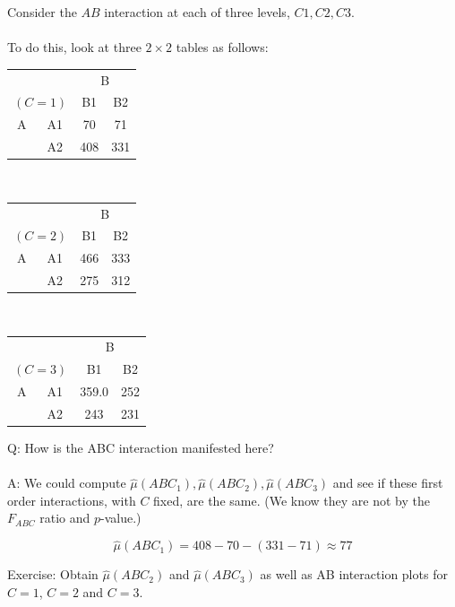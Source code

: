 Consider the $AB$ interaction at each of three levels, $C1,C2,C3$. \\~\\
To do this, look at three $2 \times 2$ tables as follows: 
\begin{center}
\begin{tabular}{cc|cc|}
&& \multicolumn{2}{c}{B} \\
\multicolumn{2}{c|}{$(C=1)$} & B1 & B2 \\ \hline
A & A1 & 70 & 71 \\
  & A2 & 408 & 331 \\ \hline
\end{tabular} \\

\begin{tabular}{cc|cc|}
&& \multicolumn{2}{c}{B} \\
\multicolumn{2}{c|}{$(C=2)$} & B1 & B2 \\ \hline
A & A1 & 466 & 333 \\
  & A2 & 275 & 312 \\ \hline
\end{tabular} \\

\begin{tabular}{cc|cc|}
&& \multicolumn{2}{c}{B} \\
\multicolumn{2}{c|}{$(C=3)$} & B1 & B2 \\ \hline
A & A1 & 359.0 & 252 \\
  & A2 & 243 & 231 \\ \hline
\end{tabular}
\end{center}

Q: How is the ABC interaction manifested here?\\~\\
A: We could compute $\hat\mu(ABC_1),\hat\mu(ABC_2),\hat\mu(ABC_3)$ and see if these first order interactions, with $C$ fixed, are the same.  (We know they are not by the $F_{ABC}$ ratio and $p$-value.)

$$\hat\mu(ABC_1) = 408-70-(331-71) \approx 77$$

Exercise: Obtain $\hat\mu(ABC_2)$ and $\hat\mu(ABC_3)$ as well as AB interaction plots for $C=1$, $C=2$ and $C=3$. 

